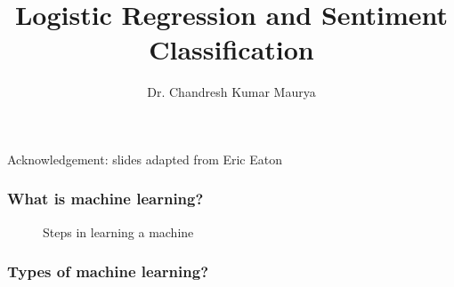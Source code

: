 \documentclass[blue]{beamer}
\title{Logistic Regression and Sentiment Classification }
\author[Dr. Chandresh]{Dr. Chandresh Kumar Maurya }
\institute{IBM Research, Bangalore}
\begin{document}
\titlepage 
{\footnotesize Acknowledgement: slides adapted from Eric Eaton}

\begin{frame}
\frametitle{What is machine learning?}
\begin{figure}
\caption{Steps in learning a machine}
\end{figure}


\end{frame}
\begin{frame}
\frametitle{Types of machine learning?}
\begin{figure}

\end{figure}


\end{frame}



%
%
%
\end{document}
